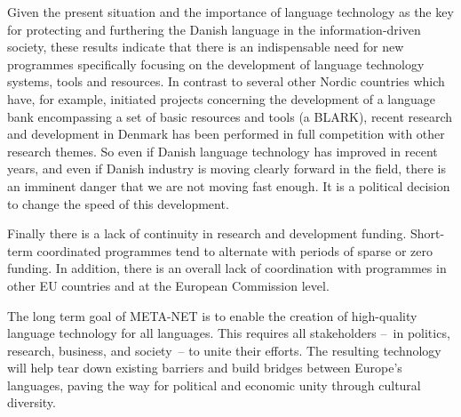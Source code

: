 \begin{multicols}{2}
Given the present situation and the importance of language technology as the key for protecting and furthering the Danish language in the information-driven society, these results indicate that there is an indispensable need for new programmes specifically focusing on the development of language technology systems, tools and resources. In contrast to several other Nordic countries which have, for example,  initiated projects concerning the development of a language bank encompassing a set of basic resources and tools (a BLARK), recent research and development in Denmark has been performed in full competition with other research themes.  So even if Danish language technology has improved in recent years, and even if Danish industry is moving clearly forward in the field, there is an imminent danger that we are not moving fast enough. It is a political decision to change the speed of this development.

Finally there is a lack of continuity in research and development funding. Short-term coordinated programmes tend to alternate with periods of sparse or zero funding. In addition, there is an overall lack of coordination with programmes in other EU countries and at the European Commission level.

The long term goal of META-NET is to enable the creation of high-quality language technology for all languages. This requires all stakeholders --~in politics, research, business, and society~-- to unite their efforts. The resulting technology will help tear down existing barriers and build bridges between Europe’s languages, paving the way for political and economic unity through cultural diversity. 
\end{multicols}

\clearpage


